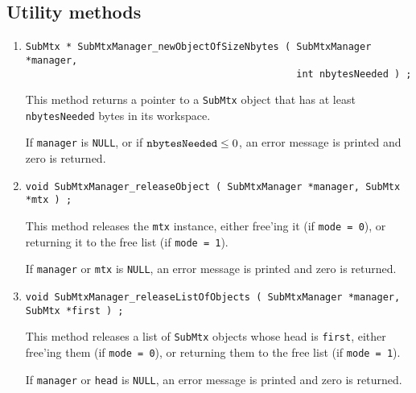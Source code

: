 \subsection{Utility methods}
\label{subsection:SubMtxManager:proto:utility}
\par
\begin{enumerate}
\item
\begin{verbatim}
SubMtx * SubMtxManager_newObjectOfSizeNbytes ( SubMtxManager *manager,
                                               int nbytesNeeded ) ;
\end{verbatim}
\par
This method returns a pointer to a {\tt SubMtx} object that has
at least {\tt nbytesNeeded} bytes in its workspace.
\par {}
If {\tt manager} is {\tt NULL},
or if ${\tt nbytesNeeded} \le 0$,
an error message is printed and zero is returned.
\item
\begin{verbatim}
void SubMtxManager_releaseObject ( SubMtxManager *manager, SubMtx *mtx ) ;
\end{verbatim}
\par
This method releases the {\tt mtx} instance, 
either free'ing it (if {\tt mode = 0}),
or returning it to the free list (if {\tt mode = 1}).
\par {}
If {\tt manager} or {\tt mtx} is {\tt NULL},
an error message is printed and zero is returned.
\item
\begin{verbatim}
void SubMtxManager_releaseListOfObjects ( SubMtxManager *manager, SubMtx *first ) ;
\end{verbatim}
\par
This method releases a list of {\tt SubMtx} objects whose head
is {\tt first}, 
either free'ing them (if {\tt mode = 0}),
or returning them to the free list (if {\tt mode = 1}).
\par {}
If {\tt manager} or {\tt head} is {\tt NULL},
an error message is printed and zero is returned.
\end{enumerate}
\par
